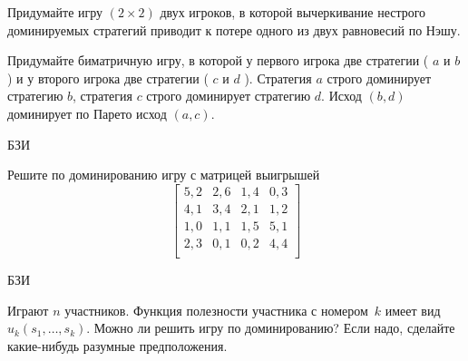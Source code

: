 \begin{problem}

Придумайте игру  $\left(2\times 2\right)$  двух игроков, в которой вычеркивание нестрого доминируемых стратегий приводит к потере одного из двух равновесий по Нэшу.



\begin{sol}

\end{sol}
\end{problem}


\begin{problem}

Придумайте биматричную игру, в которой у первого игрока две стратегии ( $a$  и  $b$ ) и у второго игрока две стратегии ( $c$  и  $d$ ). Стратегия  $a$  строго доминирует стратегию  $b$, стратегия  $c$  строго доминирует стратегию  $d$. Исход  $\left(b,d\right)$  доминирует по Парето исход  $\left(a,c\right)$.



\begin{sol}

\end{sol}
\end{problem}


\begin{problem}
\begin{source}
БЗИ
\end{source}
Решите по доминированию игру с матрицей
выигрышей
\[\left[\begin{array}{cccc} 5,2&2,6&1,4&0,3\\ 4,1&3,4&2,1&1,2\\
1,0&1,1&1,5&5,1\\ 2,3&0,1&0,2&4,4\\
\end{array}\right]\]
\begin{sol}
\end{sol}
\end{problem}




\begin{problem}
\begin{source}
БЗИ
\end{source}
Играют $n$ участников.
Функция полезности участника с номером~$k$ имеет вид
$u_k(s_1,\ldots,s_k)$. Можно ли решить игру по
доминированию? Если надо, сделайте какие-нибудь разумные
предположения.
\begin{sol}
\end{sol}
\end{problem}


